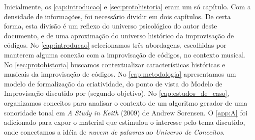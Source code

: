 Inicialmente, os \autoref{cap:introducao} e \autoref{sec:protohistoria} eram um só capítulo. Com a densidade de informações, foi necessário dividir em dois capítulos. De certa forma, esta divisão é um reflexo do universo psicológico do autor deste documento, e de uma aproximação do universo histórico da improvisação de códigos. No \autoref{cap:introducao} selecionamos três abordagens, escolhidas por manterem alguma conexão com a improvisação de códigos, no contexto musical.  No \autoref{sec:protohistoria} buscamos contextualizar características históricas e musicais da improvisação de códigos. No \autoref{cap:metodologia} apresentamos um modelo de formalização da criatividade, do ponto de vista do Modelo de Improvisação discutido por  (segundo objetivo). No \autoref{cap:estudos_de_caso}, organizamos conceitos para analisar o contexto de um algoritmo gerador de uma sonoridade tonal em \emph{A Study in Keith} (2009) de Andrew Sorensen.  O \autoref{app:A} foi adicionado para expor o material que estimulou o interesse pelo tema discutido, onde conectamos a idéia de \emph{nuvem de palavras} ao \emph{Universo de Conceitos}.%